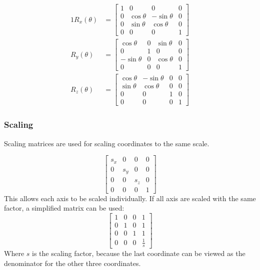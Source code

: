\begin{alignat}{1}
	R_x(\theta) &= \begin{bmatrix}
		1 & 0 & 0 & 0\\
		0 & \cos \theta &  -\sin \theta & 0\\
		0 & \sin \theta  &  \cos \theta  & 0\\
		0 & 0 & 0 & 1
	\end{bmatrix} \\
	R_y(\theta) &= \begin{bmatrix}
		\cos \theta & 0 & \sin \theta & 0\\
		0 & 1 & 0 & 0\\
		-\sin \theta & 0 & \cos \theta & 0 \\
		0 & 0 & 0 & 1
	\end{bmatrix} \\
	R_z(\theta) &= \begin{bmatrix}
		\cos \theta &  -\sin \theta & 0 & 0\\
		\sin \theta & \cos \theta & 0 & 0\\
		0 & 0 & 1 & 0\\
		0 & 0 & 0 & 1
	\end{bmatrix}
\end{alignat}
\subsubsection{Scaling}

Scaling matrices are used for scaling coordinates to the same scale.

\[
\begin{bmatrix}
s_{x} & 0 & 0 & 0\\ 
0 & s_{y} & 0 & 0\\ 
0 & 0 & s_{z} & 0\\ 
0 & 0 & 0 & 1
\end{bmatrix}
\]
This allows each axis to be scaled individually. If all axis are scaled with the same factor, a simplified matrix can be used:
 \[\begin{bmatrix}
 1 & 0 & 0 & 1\\
 0 & 1 & 0 & 1\\ 
 0 & 0 & 1 & 1\\ 
 0 & 0 & 0 & \frac{1}{s}
 \end{bmatrix}\]
Where $s$ is the scaling factor, because the last coordinate can be viewed as the denominator for the other three coordinates.

